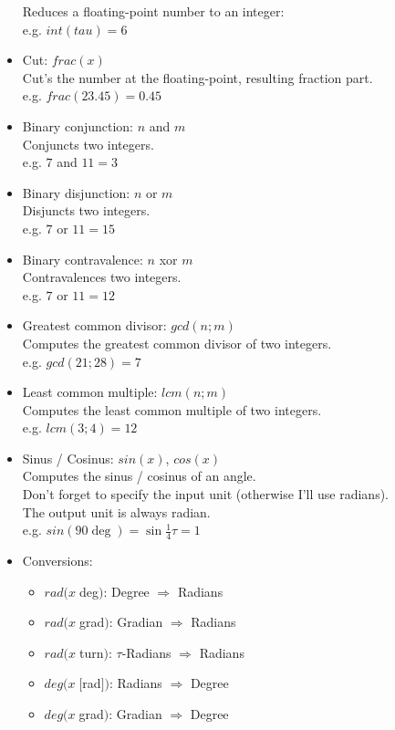 \documentclass[12pt,a4paper]{article}
\begin{document}
\begin{itemize}
			  Reduces a floating-point number to an integer:\\
			  e.g. $int(tau) = 6$
		\item Cut: $frac(x)$\\
			  Cut's the number at the floating-point, resulting fraction part.\\
			  e.g. $frac(23.45) = 0.45$
		\item Binary conjunction: $n$ and $m$\\
			  Conjuncts two integers.\\
			  e.g. $7$ and $11 = 3$
		\item Binary disjunction: $n$ or $m$\\
			  Disjuncts two integers.\\
			  e.g. $7$ or $11 = 15$
		\item Binary contravalence: $n$ xor $m$\\
			  Contravalences two integers.\\
			  e.g. $7$ or $11 = 12$
		\item Greatest common divisor: $gcd(n; m)$\\
			  Computes the greatest common divisor of two integers.\\
			  e.g. $gcd(21; 28) = 7$
		\item Least common multiple: $lcm(n; m)$\\
			  Computes the least common multiple of two integers.\\
			  e.g. $lcm(3; 4) = 12$
		\item Sinus / Cosinus: $sin(x)$, $cos(x)$\\
			  Computes the sinus / cosinus of an angle.\\
			  Don't forget to specify the input unit (otherwise I'll use radians).\\
			  The output unit is always radian.\\
			  e.g. $sin(90 \deg) = \sin \frac{1}{4} \tau = 1$
		\item Conversions:
			  \begin{itemize}
			  	\item $rad(x\;$deg$)$: Degree $\Rightarrow$ Radians
			  	\item $rad(x\;$grad$)$: Gradian $\Rightarrow$ Radians
			  	\item $rad(x\;$turn$)$: $\tau$-Radians $\Rightarrow$ Radians
			  	\item $deg(x\;[$rad$])$: Radians $\Rightarrow$ Degree
			  	\item $deg(x\;$grad$)$: Gradian $\Rightarrow$ Degree

\end{itemize}
\end{itemize}
\end{document}
